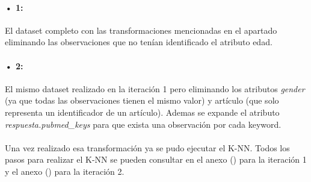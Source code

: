 \paragraph{• 1: } El dataset completo con las transformaciones mencionadas en el apartado  eliminando las observaciones que no tenían identificado el atributo edad.

\paragraph{• 2: } El mismo dataset realizado en la iteración 1 pero eliminando los atributos \textit{gender} (ya que todas las observaciones tienen el mismo valor) y artículo (que solo representa un identificador de un artículo). Ademas se expande el atributo \textit{respuesta.pubmed\_keys} para que exista una observación por cada keyword.

\paragraph{}
Una vez realizado esa transformación ya se pudo ejecutar el K-NN. Todos los pasos para realizar el K-NN se pueden consultar en el anexo () para la iteración 1 y el anexo () para la iteración 2.